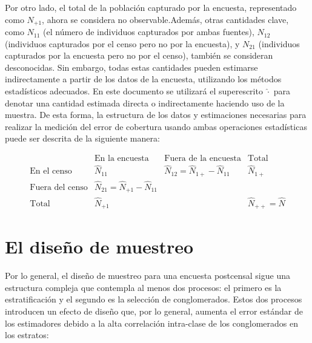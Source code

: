 \documentclass[
  12pt,
]{book}
\begin{document}
Por otro lado, el total de la población capturado por la encuesta, representado como \(N_{+1}\), ahora se considera no observable.Además, otras cantidades clave, como \(N_{11}\) (el número de individuos capturados por ambas fuentes), \(N_{12}\) (individuos capturados por el censo pero no por la encuesta), y \(N_{21}\) (individuos capturados por la encuesta pero no por el censo), también se consideran desconocidas. Sin embargo, todas estas cantidades pueden estimarse indirectamente a partir de los datos de la encuesta, utilizando los métodos estadísticos adecuados. En este documento se utilizará el superescrito \(\hat \cdot\) para denotar una cantidad estimada directa o indirectamente haciendo uso de la muestra. De esta forma, la estructura de los datos y estimaciones necesarias para realizar la medición del error de cobertura usando ambas operaciones estadísticas puede ser descrita de la siguiente manera:

\[
    \begin{array}{c|cc|c}
    & \text{En la encuesta} & \text{Fuera de la encuesta} & \text{Total} \\
    \hline
    \text{En el censo} & \hat N_{11} & \hat N_{12} = \hat N_{1+} - \hat N_{11} & \hat N_{1+} \\
    \text{Fuera del censo} & \hat N_{21} = \hat N_{+1} - \hat N_{11} &  &  \\
    \hline
    \text{Total} & \hat N_{+1} &  & \hat N_{++} = \hat N
    \end{array}
    \]

\hypertarget{el-diseuxf1o-de-muestreo}{%
\section{El diseño de muestreo}\label{el-diseuxf1o-de-muestreo}}

Por lo general, el diseño de muestreo para una encuesta postcensal sigue una estructura compleja que contempla al menos dos procesos: el primero es la estratificación y el segundo es la selección de conglomerados. Estos dos procesos introducen un efecto de diseño que, por lo general, aumenta el error estándar de los estimadores debido a la alta correlación intra-clase de los conglomerados en los estratos:
\end{document}
